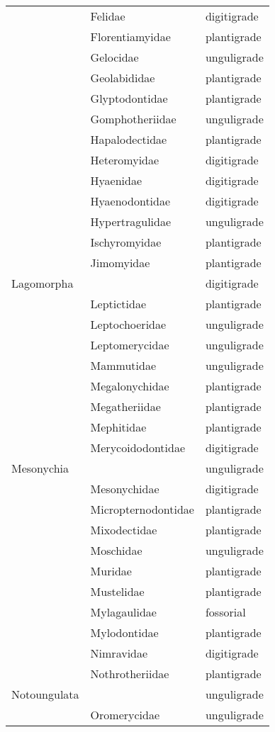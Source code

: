 \begin{table}[ht]
\begin{tabular}{lll}
   & Felidae & digitigrade \\ 
   & Florentiamyidae & plantigrade \\ 
   & Gelocidae & unguligrade \\ 
   & Geolabididae & plantigrade \\ 
   & Glyptodontidae & plantigrade \\ 
   & Gomphotheriidae & unguligrade \\ 
   & Hapalodectidae & plantigrade \\ 
   & Heteromyidae & digitigrade \\ 
   & Hyaenidae & digitigrade \\ 
   & Hyaenodontidae & digitigrade \\ 
   & Hypertragulidae & unguligrade \\ 
   & Ischyromyidae & plantigrade \\ 
   & Jimomyidae & plantigrade \\ 
  Lagomorpha &  & digitigrade \\ 
   & Leptictidae & plantigrade \\ 
   & Leptochoeridae & unguligrade \\ 
   & Leptomerycidae & unguligrade \\ 
   & Mammutidae & unguligrade \\ 
   & Megalonychidae & plantigrade \\ 
   & Megatheriidae & plantigrade \\ 
   & Mephitidae & plantigrade \\ 
   & Merycoidodontidae & digitigrade \\ 
  Mesonychia &  & unguligrade \\ 
   & Mesonychidae & digitigrade \\ 
   & Micropternodontidae & plantigrade \\ 
   & Mixodectidae & plantigrade \\ 
   & Moschidae & unguligrade \\ 
   & Muridae & plantigrade \\ 
   & Mustelidae & plantigrade \\ 
   & Mylagaulidae & fossorial \\ 
   & Mylodontidae & plantigrade \\ 
   & Nimravidae & digitigrade \\ 
   & Nothrotheriidae & plantigrade \\ 
  Notoungulata &  & unguligrade \\ 
   & Oromerycidae & unguligrade \\ 

\end{tabular}
\end{table}

